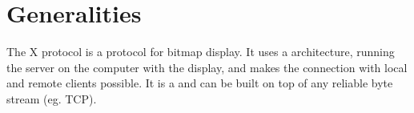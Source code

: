 \section{Generalities}
The X protocol is a  protocol for bitmap display. 
It uses a  architecture, running the server on the computer 
with the display, and makes the connection with local and remote clients possible. 
It is a  and can be built on 
top of any reliable byte stream (eg. TCP).